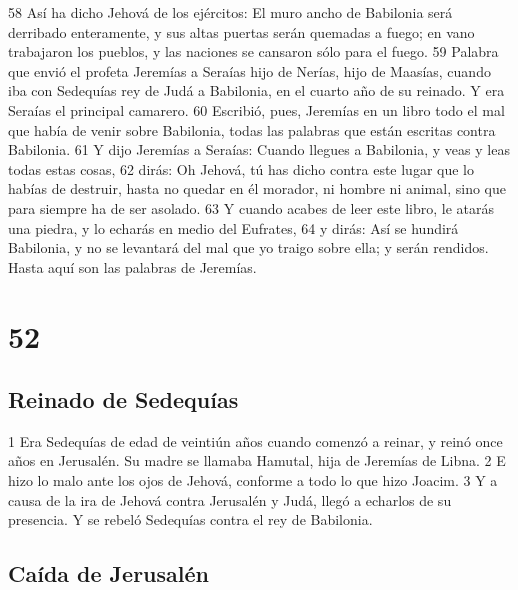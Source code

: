 58 Así ha dicho Jehová de los ejércitos: El muro ancho de Babilonia será derribado enteramente, y sus altas puertas serán quemadas a fuego; en vano trabajaron los pueblos, y las naciones se cansaron sólo para el fuego.
59 Palabra que envió el profeta Jeremías a Seraías hijo de Nerías, hijo de Maasías, cuando iba con Sedequías rey de Judá a Babilonia, en el cuarto año de su reinado. Y era Seraías el principal camarero.
60 Escribió, pues, Jeremías en un libro todo el mal que había de venir sobre Babilonia, todas las palabras que están escritas contra Babilonia.
61 Y dijo Jeremías a Seraías: Cuando llegues a Babilonia, y veas y leas todas estas cosas,
62 dirás: Oh Jehová, tú has dicho contra este lugar que lo habías de destruir, hasta no quedar en él morador, ni hombre ni animal, sino que para siempre ha de ser asolado.
63 Y cuando acabes de leer este libro, le atarás una piedra, y lo echarás en medio del Eufrates,
64 y dirás: Así se hundirá Babilonia, y no se levantará del mal que yo traigo sobre ella; y serán rendidos. Hasta aquí son las palabras de Jeremías. 

\chapter{52}

\section*{Reinado de Sedequías }

1 Era Sedequías de edad de veintiún años cuando comenzó a reinar, y reinó once años en Jerusalén. Su madre se llamaba Hamutal, hija de Jeremías de Libna.
2 E hizo lo malo ante los ojos de Jehová, conforme a todo lo que hizo Joacim.
3 Y a causa de la ira de Jehová contra Jerusalén y Judá, llegó a echarlos de su presencia. Y se rebeló Sedequías contra el rey de Babilonia.

\section*{Caída de Jerusalén}

